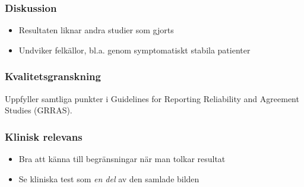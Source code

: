 \documentclass[aspectratio=169,12pt,handout,usenames,dvipsnames]{beamer}
\begin{document}
\begin{frame}
	\frametitle{Diskussion}
	\begin{itemize}
		\item Resultaten liknar andra studier som gjorts
		\item Undviker felkällor, bl.a. genom symptomatiskt stabila patienter
	\end{itemize}
\end{frame}

\begin{frame}
	\frametitle{Kvalitetsgranskning}
	Uppfyller samtliga punkter i Guidelines for Reporting Reliability and Agreement Studies (GRRAS).

\end{frame}

\begin{frame}
	\frametitle{Klinisk relevans}
	\begin{itemize}
		\item Bra att känna till begränsningar när man tolkar resultat
		\item Se kliniska test som \emph{en del} av den samlade bilden
	\end{itemize}
\end{frame}
\end{document}
